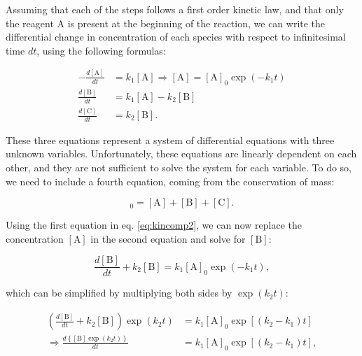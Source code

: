 \documentclass[
  9pt,
]{extbook}
\theoremstyle{definition}
\theoremstyle{definition}
\theoremstyle{definition}
\theoremstyle{definition}
\theoremstyle{remark}
\begin{document}
Assuming that each of the steps follows a first order kinetic law, and that only the reagent \(\mathrm{A}\) is present at the beginning of the reaction, we can write the differential change in concentration of each species with respect to infinitesimal time \(dt\), using the following formulas:

\begin{equation}
\begin{aligned}
-\frac{d[\mathrm{A}]}{dt}&=k_1 [\mathrm{A}] \Rightarrow [\mathrm{A}] = [\mathrm{A}]_0 \exp(-k_1 t) \\
\frac{d[\mathrm{B}]}{dt} &=k_1 [\mathrm{A}]-k_2 [\mathrm{B}] \\
\frac{d[\mathrm{C}]}{dt} &=k_2 [\mathrm{B}].
\end{aligned}
\label{eq:kincomp2}
\end{equation}

These three equations represent a system of differential equations with three unknown variables. Unfortunately, these equations are linearly dependent on each other, and they are not sufficient to solve the system for each variable. To do so, we need to include a fourth equation, coming from the conservation of mass:

\begin{equation}
[\mathrm{A}]_0=[\mathrm{A}]+[\mathrm{B}]+[\mathrm{C}].
\label{eq:kincomp3}
\end{equation}

Using the first equation in eq. \eqref{eq:kincomp2}, we can now replace the concentration \([\mathrm{A}]\) in the second equation and solve for \([\mathrm{B}]\):

\begin{equation}
\frac{d[\mathrm{B}]}{dt}+k_2 [\mathrm{B}]=k_1 [\mathrm{A}]_0 \exp(-k_1 t),
\label{eq:kincomp4}
\end{equation}

which can be simplified by multiplying both sides by \(\exp (k_2t)\):

\begin{equation}
\begin{aligned}
\left( \frac{d[\mathrm{B}]}{dt}+k_2 [\mathrm{B}] \right) \exp (k_2t) &= k_1 [\mathrm{A}]_0 \exp[(k_2-k_1) t] \\
\Rightarrow \frac{d\left\{[\mathrm{B}]\exp (k_2t)\right\}}{dt} &= k_1 [\mathrm{A}]_0 \exp[(k_2-k_1) t],
\end{aligned}
\label{eq:kincomp5}
\end{equation}
\end{document}
